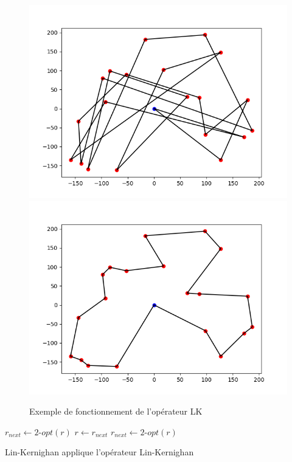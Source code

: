 \documentclass[a4paper,11pt]{article}%
\begin{document}
\begin{figure}
\centering
\includegraphics[scale=0.4]{test4_20_init.png}
\includegraphics[scale=0.4]{test4_20_LKopt.png}

\caption{Exemple de fonctionnement de l'opérateur LK}
\label{LK}
\end{figure}

\begin{algorithm}
\DontPrintSemicolon %
$r_{next} \gets 2$-$opt(r) $\;
 {
  $r \gets r_{next}$\;
  $r_{next} \gets 2$-$opt(r)$\;
}
\;
\caption{{\sc Lin-Kernighan} applique l'opérateur Lin-Kernighan}
\label{algo:LK}
\end{algorithm}
\end{document}
